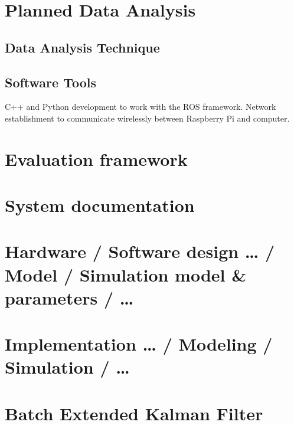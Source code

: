\section{Planned Data Analysis}
\label{sec:plannedDataAnalysis}

\subsection{Data Analysis Technique}

\subsection{Software Tools}
C++ and Python development to work with the ROS framework.
Network establishment to communicate wirelessly between Raspberry Pi and computer.


\section{Evaluation framework}
\label{sec:evaluationFramework}

\section{System documentation}




\section{Hardware / Software design … / Model / Simulation model \& parameters / …}




\section{Implementation … / Modeling / Simulation / …}
\label{sec:implementationDetails}

\section{Batch Extended Kalman Filter}

